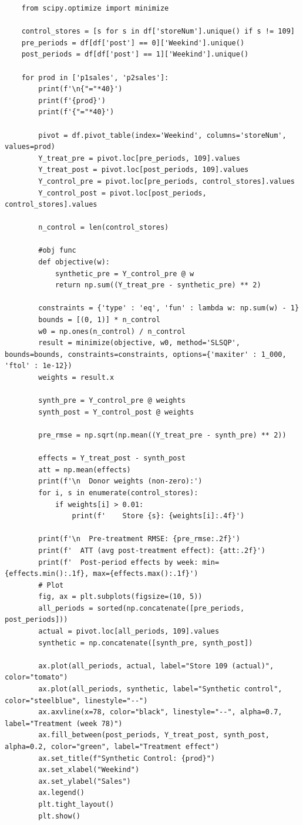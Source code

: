 \documentclass[10pt]{article}
\begin{document}
\begin{lstlisting}
    from scipy.optimize import minimize 

    control_stores = [s for s in df['storeNum'].unique() if s != 109]
    pre_periods = df[df['post'] == 0]['Weekind'].unique()
    post_periods = df[df['post'] == 1]['Weekind'].unique()

    for prod in ['p1sales', 'p2sales']:
        print(f'\n{"="*40}')
        print(f'{prod}')
        print(f'{"="*40}')

        pivot = df.pivot_table(index='Weekind', columns='storeNum', values=prod)
        Y_treat_pre = pivot.loc[pre_periods, 109].values
        Y_treat_post = pivot.loc[post_periods, 109].values
        Y_control_pre = pivot.loc[pre_periods, control_stores].values
        Y_control_post = pivot.loc[post_periods, control_stores].values

        n_control = len(control_stores)

        #obj func
        def objective(w): 
            synthetic_pre = Y_control_pre @ w
            return np.sum((Y_treat_pre - synthetic_pre) ** 2)

        constraints = {'type' : 'eq', 'fun' : lambda w: np.sum(w) - 1}
        bounds = [(0, 1)] * n_control
        w0 = np.ones(n_control) / n_control
        result = minimize(objective, w0, method='SLSQP', bounds=bounds, constraints=constraints, options={'maxiter' : 1_000, 'ftol' : 1e-12})
        weights = result.x

        synth_pre = Y_control_pre @ weights 
        synth_post = Y_control_post @ weights 

        pre_rmse = np.sqrt(np.mean((Y_treat_pre - synth_pre) ** 2))

        effects = Y_treat_post - synth_post 
        att = np.mean(effects)
        print(f'\n  Donor weights (non-zero):')
        for i, s in enumerate(control_stores):
            if weights[i] > 0.01:
                print(f'    Store {s}: {weights[i]:.4f}')
        
        print(f'\n  Pre-treatment RMSE: {pre_rmse:.2f}')
        print(f'  ATT (avg post-treatment effect): {att:.2f}')
        print(f'  Post-period effects by week: min={effects.min():.1f}, max={effects.max():.1f}')
        # Plot
        fig, ax = plt.subplots(figsize=(10, 5))
        all_periods = sorted(np.concatenate([pre_periods, post_periods]))
        actual = pivot.loc[all_periods, 109].values
        synthetic = np.concatenate([synth_pre, synth_post])
        
        ax.plot(all_periods, actual, label="Store 109 (actual)", color="tomato")
        ax.plot(all_periods, synthetic, label="Synthetic control", color="steelblue", linestyle="--")
        ax.axvline(x=78, color="black", linestyle="--", alpha=0.7, label="Treatment (week 78)")
        ax.fill_between(post_periods, Y_treat_post, synth_post, alpha=0.2, color="green", label="Treatment effect")
        ax.set_title(f"Synthetic Control: {prod}")
        ax.set_xlabel("Weekind")
        ax.set_ylabel("Sales")
        ax.legend()
        plt.tight_layout()
        plt.show()
\end{lstlisting}
\end{document}
